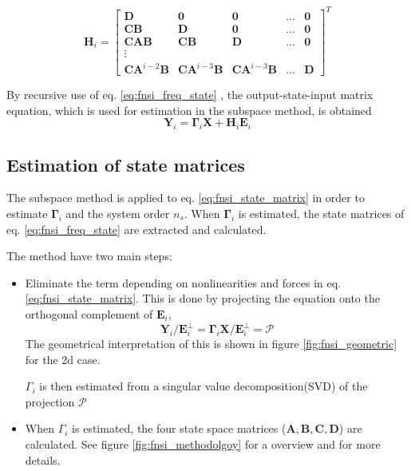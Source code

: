 \begin{equation}
  \bm H_i =
  \begin{bmatrix}
    \bm D                   & \bm 0                   & \bm 0                   & \dots & \bm 0 \\
    \bm C \bm B             & \bm D                   & \bm 0                   & \dots & \bm 0 \\
    \bm C \bm A \bm B       & \bm C \bm B             & \bm D                   & \dots & \bm 0 \\
    \vdots \\
    \bm C \bm A^{i-2} \bm B & \bm C \bm A^{i-3} \bm B & \bm C \bm A^{i-3} \bm B & \dots & \bm D
  \end{bmatrix}^T
\end{equation}

By recursive use of eq. \eqref{eq:fnsi_freq_state} \autocite{noel2013a}, the
output-state-input matrix equation, which is used for estimation in the subspace
method, is obtained
\begin{equation}
  \label{eq:fnsi_state_matrix}
  \bm Y_i = \bm \Gamma_i \bm X + \bm H_i \bm E_i
\end{equation}


\subsection{Estimation of state matrices}

The subspace method is applied to eq. \eqref{eq:fnsi_state_matrix} in order to
estimate $\bm \Gamma_i$ and the system order $n_s$. When $\bm \Gamma_i$ is
estimated, the state matrices of eq. \eqref{eq:fnsi_freq_state} are extracted
and calculated.

The method have two main steps:
\begin{itemize}
\item Eliminate the term depending on nonlinearities and forces in eq.
  \eqref{eq:fnsi_state_matrix}. This is done by projecting the equation onto the
  orthogonal complement of $\bm E_i$,
  \begin{equation}
    \bm Y_i / \bm E_i^\perp = \bm \Gamma_i \bm X / \bm E_i^\perp = \mathcal{P}
  \end{equation}
  The geometrical interpretation of this is shown in figure
  \ref{fig:fnsi_geometric} for the 2d case.

  $\Gamma_i$ is then estimated from a singular value decomposition(SVD) of the
  projection $\mathcal{P}$
\item When $\Gamma_i$ is estimated, the four state space matrices ($\bm A, \bm
  B, \bm C, \bm D$) are calculated. See figure \ref{fig:fnsi_methodolgoy} for a
  overview and \autocite{noel2013a} for more details.
\end{itemize}


